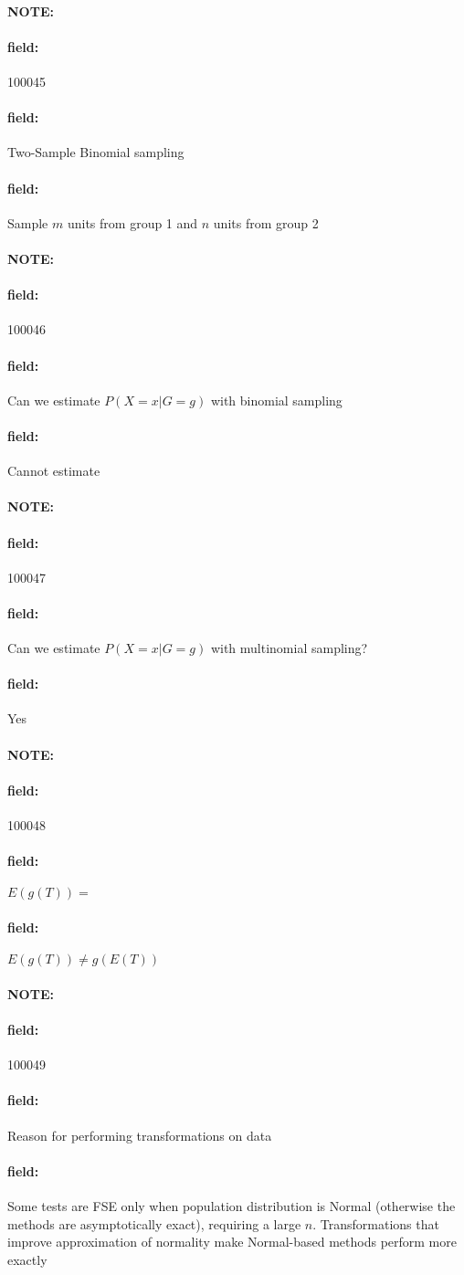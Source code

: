 \documentclass[12pt]{article}
\newenvironment{note}{\paragraph{NOTE:}}{}
\newenvironment{field}{\paragraph{field:}}{}
\begin{document}
\begin{note} \begin{field} \tiny 100045 \end{field}
 \begin{field}
  Two-Sample Binomial sampling
 \end{field}
 \begin{field}
  Sample $m$ units from group 1 and $n $ units from group 2
 \end{field}
\end{note}


\begin{note} \begin{field} \tiny 100046 \end{field}
 \begin{field}
  Can we estimate $P(X = x | G = g)$ with binomial sampling
 \end{field}
 \begin{field}
  Cannot estimate
 \end{field}
\end{note}

\begin{note} \begin{field} \tiny 100047 \end{field}
 \begin{field}
  Can we estimate $P(X = x | G = g)$ with multinomial sampling?
 \end{field}
 \begin{field}
  Yes
 \end{field}
\end{note}

\begin{note} \begin{field} \tiny 100048 \end{field}
 \begin{field}
  $E(g(T)) = $
 \end{field}
 \begin{field}
  $E(g(T)) \neq g(E(T))$
 \end{field}
\end{note}


\begin{note} \begin{field} \tiny 100049 \end{field}
 \begin{field}
  Reason for performing transformations on data
 \end{field}
 \begin{field}
  Some tests are FSE only when population distribution is Normal (otherwise the methods are asymptotically exact), requiring a large $n$. Transformations that improve approximation of normality make Normal-based methods perform more exactly
 \end{field}
\end{note}
\end{document}
